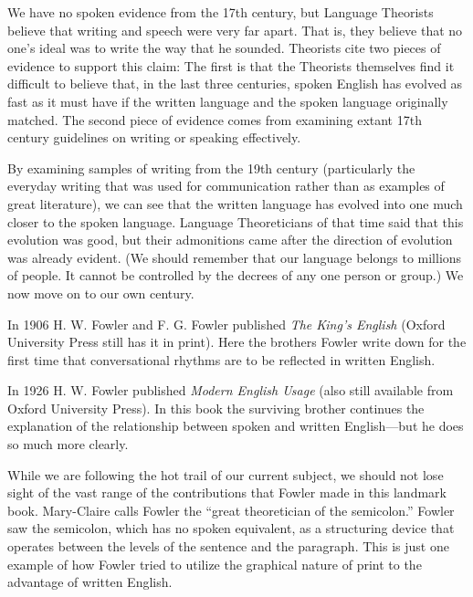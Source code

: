 \smallskip
{}

\medskip
We have no spoken evidence from the 17th century, but Language Theorists
believe that writing and speech were very far apart. That is, 
they believe
that no
one's ideal was to write the way that he sounded. Theorists cite two
pieces of evidence to support this claim: The first is that the Theorists
themselves find it difficult to believe that, in the last three centuries,
spoken English has evolved as fast as it must have if the  written
language and the spoken language originally matched.  The second piece of
evidence comes from examining extant 17th century guidelines on writing or
speaking effectively.

By examining samples of writing from the 19th century (particularly the
everyday writing that was used for communication rather than as examples
of great literature), we can see that the written language has evolved
into one much closer to the spoken language.  Language Theoreticians of
that time said that this evolution was good, but their admonitions came
after the direction of evolution was already evident.  (We should remember
that our language belongs to millions of people.  It cannot be controlled
by the decrees of any one person or group.)  We now move on to our
own century.

In 1906 H. W. Fowler and F. G. Fowler published {\sl The King's English\/}
(Oxford University Press still has it in print).  Here
the brothers Fowler
write down for the first time that conversational rhythms are to be
reflected in written English.  

In 1926 H. W. Fowler published {\sl Modern English Usage\/} (also still
available from Oxford University Press).  In this book the surviving
brother continues the explanation of the relationship between spoken and
written English---but he does so much more clearly.  

While we are following the hot trail of our current subject, we should not
lose sight of the vast range of the contributions that Fowler made in
this landmark book. Mary-Claire calls Fowler the ``great theoretician of
the semicolon.'' Fowler saw the semicolon, which has no spoken
equivalent, as a structuring device that operates between the levels of
the sentence and the paragraph.  This is just one example of how Fowler
tried to utilize the graphical nature of print to the advantage of written
English.

